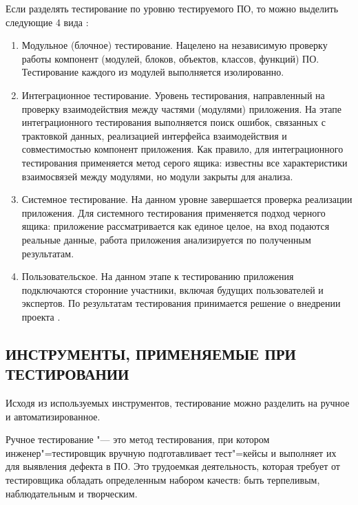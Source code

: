 Если разделять тестирование по уровню тестируемого ПО, то можно выделить 
следующие 4 вида \cite{Bugaenko}:
\begin{enumerate}
    \item Модульное (блочное) тестирование. Нацелено на независимую проверку 
    работы компонент (модулей, блоков, объектов, классов, функций) ПО. 
    Тестирование каждого из модулей выполняется изолированно.
    \item Интеграционное тестирование. Уровень тестирования, направленный на 
    проверку взаимодействия между частями (модулями) приложения. На этапе 
    интеграционного тестирования выполняется поиск ошибок, связанных с 
    трактовкой данных, реализацией интерфейса взаимодействия и совместимостью 
    компонент приложения. Как правило, для интеграционного тестирования 
    применяется метод серого ящика: известны все характеристики взаимосвязей 
    между модулями, но модули закрыты для анализа.
    \item Системное тестирование. На данном уровне завершается проверка 
    реализации приложения. Для системного тестирования применяется подход 
    черного ящика: приложение рассматривается как единое целое, на вход подаются 
    реальные данные, работа приложения анализируется по полученным результатам.
    \item Пользовательское. На данном этапе к тестированию приложения 
    подключаются сторонние участники, включая будущих пользователей и экспертов. 
    По результатам тестирования принимается решение о внедрении проекта \cite{BaseofTest}.
\end{enumerate}
\subsection{ИНСТРУМЕНТЫ, ПРИМЕНЯЕМЫЕ ПРИ ТЕСТИРОВАНИИ}
Исходя из используемых инструментов, тестирование можно разделить на ручное и 
автоматизированное.

Ручное тестирование "--- это метод тестирования, при котором 
инженер"=тестировщик вручную подготавливает тест"=кейсы и выполняет их для 
выявления дефекта в ПО. Это трудоемкая деятельность, которая требует от 
тестировщика обладать определенным набором качеств: быть терпеливым, 
наблюдательным и творческим.

